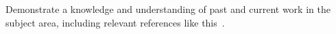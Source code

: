 Demonstrate a knowledge and understanding of past and current work in the subject area, including relevant references like this~\cite{template}.
